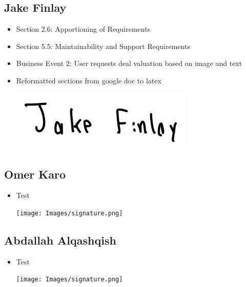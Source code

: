\documentclass[]{article}
\begin{document}
\subsection{Jake Finlay}
\begin{itemize}
    \item Section 2.6: Apportioning of Requirements
    \item Section 5.5: Maintainability and Support Requirements
    \item Business Event 2: User requests deal valuation based on image and text
    \item Reformatted sections from google doc to latex
    \begin{center}
        \includegraphics[scale=0.7]{Images/jake.png}
    \end{center}
\end{itemize}

\subsection{Omer Karo}
\begin{itemize}
    \item Test
    \begin{center}
        \texttt{[image: Images/signature.png]}
    \end{center}
\end{itemize}

\subsection{Abdallah Alqashqish}
\begin{itemize}
    \item Test
    \begin{center}
        \texttt{[image: Images/signature.png]}
    \end{center}
\end{itemize}
\end{document}
